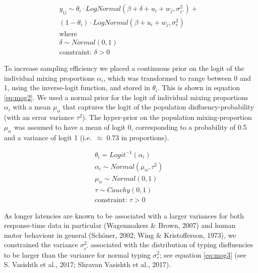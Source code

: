 \documentclass[
  english,
  man,mask,floatsintext]{apa7}
\begin{document}
\begin{equation}
\begin{aligned}
\label{eq:mog}
    y_{ij} \sim \theta_i \cdot LogNormal(\beta + \delta + u_i + w_j, \sigma_{e'}^2) +\\
        (1 - \theta_i) \cdot LogNormal(\beta + u_i + w_j, \sigma_{e}^2)\\
        \text{where}\\
        \delta \sim Normal(0,1)\\
        \text{constraint: } \delta > 0
\end{aligned}   
\end{equation}

To increase sampling efficiency we placed a continuous prior on the logit of the individual mixing proportions \(\alpha_i\), which was transformed to range between 0 and 1, using the inverse-logit function, and stored in \(\theta_i\). This is shown in equation \ref{eq:mog2}. We used a normal prior for the logit of individual mixing proportions \(\alpha_i\) with a mean \(\mu_{\alpha}\) that captures the logit of the population disfluency-probability (with an error variance \(\tau^2\)). The hyper-prior on the population mixing-proportion \(\mu_{\alpha}\) was assumed to have a mean of logit 0, corresponding to a probability of 0.5 and a variance of logit 1 (i.e.~\(\approx\) 0.73 in proportions).

\begin{equation}
\begin{aligned}
\label{eq:mog2}
        \theta_i = Logit^{-1}(\alpha_i)\\
        \alpha_i \sim Normal(\mu_{\alpha},\tau^2)\\
        \mu_{\alpha} \sim Normal(0,1)\\
        \tau \sim Cauchy(0,1)\\
        \text{constraint: } \tau > 0
\end{aligned}   
\end{equation}

As longer latencies are known to be associated with a larger variances for both response-time data in particular (Wagenmakers \& Brown, 2007) and human motor behaviour in general (Schöner, 2002; Wing \& Kristofferson, 1973), we constrained the variance \(\sigma_{e'}^2\) associated with the distribution of typing disfluencies to be larger than the variance for normal typing \(\sigma_e^2\); see equation \ref{eq:mog3} (see S. Vasishth et al., 2017; Shravan Vasishth et al., 2017).
\end{document}
